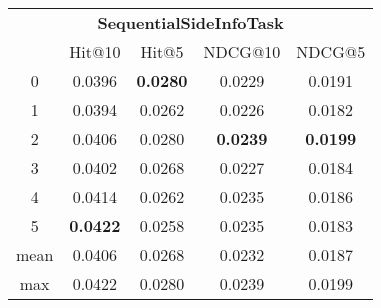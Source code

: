 \documentclass{article}
\begin{document}
 

\begin{tabular}{c|cccc}

\multicolumn{5}{c}{\textbf{SequentialSideInfoTask}} \\
\noalign{\smallskip}
\noalign{\smallskip}
\toprule
\multicolumn{1}{c}{Template ID} & \multicolumn{1}{|c}{Hit@10} & \multicolumn{1}{c}{Hit@5} & \multicolumn{1}{c}{NDCG@10} & \multicolumn{1}{c}{NDCG@5} \\
\midrule
0 & 0.0396 & \textbf{0.0280} & 0.0229 & 0.0191 \\
1 & 0.0394 & 0.0262 & 0.0226 & 0.0182 \\
2 & 0.0406 & 0.0280 & \textbf{0.0239} & \textbf{0.0199} \\
3 & 0.0402 & 0.0268 & 0.0227 & 0.0184 \\
4 & 0.0414 & 0.0262 & 0.0235 & 0.0186 \\
5 & \textbf{0.0422} & 0.0258 & 0.0235 & 0.0183 \\
\midrule
mean & 0.0406 & 0.0268 & 0.0232 & 0.0187 \\
max & 0.0422 & 0.0280 & 0.0239 & 0.0199 \\
\bottomrule

\end{tabular}
\end{document}
